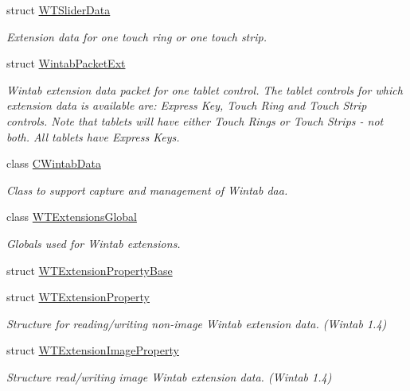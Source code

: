 \begin{DoxyCompactItemize}
struct \hyperlink{struct_wintab_d_n_1_1_w_t_slider_data}{WTSliderData}
\begin{DoxyCompactList}\small\item\em Extension data for one touch ring or one touch strip. \item\end{DoxyCompactList}\item 
struct \hyperlink{struct_wintab_d_n_1_1_wintab_packet_ext}{WintabPacketExt}
\begin{DoxyCompactList}\small\item\em Wintab extension data packet for one tablet control. The tablet controls for which extension data is available are: Express Key, Touch Ring and Touch Strip controls. Note that tablets will have either Touch Rings or Touch Strips -\/ not both. All tablets have Express Keys. \item\end{DoxyCompactList}\item 
class \hyperlink{class_wintab_d_n_1_1_c_wintab_data}{CWintabData}
\begin{DoxyCompactList}\small\item\em Class to support capture and management of Wintab daa. \item\end{DoxyCompactList}\item 
class \hyperlink{class_wintab_d_n_1_1_w_t_extensions_global}{WTExtensionsGlobal}
\begin{DoxyCompactList}\small\item\em Globals used for Wintab extensions. \item\end{DoxyCompactList}\item 
struct \hyperlink{struct_wintab_d_n_1_1_w_t_extension_property_base}{WTExtensionPropertyBase}
\item 
struct \hyperlink{struct_wintab_d_n_1_1_w_t_extension_property}{WTExtensionProperty}
\begin{DoxyCompactList}\small\item\em Structure for reading/writing non-\/image Wintab extension data. (Wintab 1.4) \item\end{DoxyCompactList}\item 
struct \hyperlink{struct_wintab_d_n_1_1_w_t_extension_image_property}{WTExtensionImageProperty}
\begin{DoxyCompactList}\small\item\em Structure read/writing image Wintab extension data. (Wintab 1.4) \item\end{DoxyCompactList}\item 

\end{DoxyCompactItemize}
